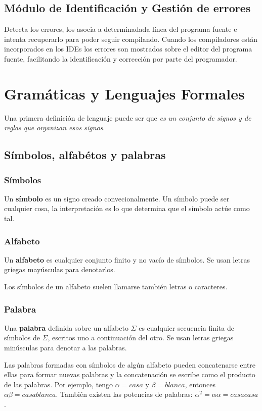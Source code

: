 \documentclass[12pt]{article}
\begin{document}
\subsection{Módulo de Identificación y Gestión de errores}
Detecta los errores, los asocia a determinadada línea del programa fuente e intenta recuperarlo para poder seguir compilando. Cuando los compiladores están incorporados en los IDEs los errores son mostrados sobre el editor del programa fuente, facilitando la identificación y corrección por parte del programador.

\section{Gramáticas y Lenguajes Formales}
Una primera definición de lenguaje puede ser que \textit{es un conjunto de signos y de reglas que organizan esos signos}.

\subsection{Símbolos, alfabétos y palabras}
\subsubsection{Símbolos}
Un \textbf{símbolo} es un signo creado convecionalmente. Un símbolo puede ser cualquier cosa, la interpretación es lo que determina que el símbolo actúe como tal.

\subsubsection{Alfabeto}
Un \textbf{alfabeto} es cualquier conjunto finito y no vacío de símbolos. Se usan letras griegas mayúsculas para denotarlos.

Los símbolos de un alfabeto suelen llamarse también letras o caracteres.

\subsubsection{Palabra}
Una \textbf{palabra} definida sobre un alfabeto $ \Sigma $ es cualquier secuencia finita de símbolos de $ \Sigma $, escritos uno a continuación del otro. Se usan letras griegas minúsculas para denotar a las palabras.

Las palabras formadas con símbolos de algún alfabeto pueden concatenarse entre ellas para formar nuevas palabras y la concatenación se escribe como el producto de las palabras. Por ejemplo, tengo $ \alpha = casa $ y $ \beta = blanca $, entonces $ \alpha\beta = casablanca $. También existen las potencias de palabras: $ \alpha^{2} = \alpha\alpha = casacasa $.
\end{document}
